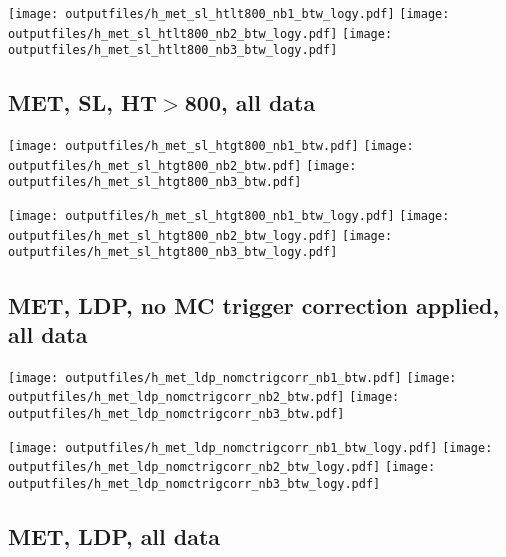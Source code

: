 \documentclass[11pt]{article}
\begin{document}
    \noindent
     \texttt{[image: outputfiles/h\_met\_sl\_htlt800\_nb1\_btw\_logy.pdf]}
     \texttt{[image: outputfiles/h\_met\_sl\_htlt800\_nb2\_btw\_logy.pdf]}
     \texttt{[image: outputfiles/h\_met\_sl\_htlt800\_nb3\_btw\_logy.pdf]}


     \subsection{ MET, SL, HT$>$800, all data}

    \noindent
     \texttt{[image: outputfiles/h\_met\_sl\_htgt800\_nb1\_btw.pdf]}
     \texttt{[image: outputfiles/h\_met\_sl\_htgt800\_nb2\_btw.pdf]}
     \texttt{[image: outputfiles/h\_met\_sl\_htgt800\_nb3\_btw.pdf]}

    \noindent
     \texttt{[image: outputfiles/h\_met\_sl\_htgt800\_nb1\_btw\_logy.pdf]}
     \texttt{[image: outputfiles/h\_met\_sl\_htgt800\_nb2\_btw\_logy.pdf]}
     \texttt{[image: outputfiles/h\_met\_sl\_htgt800\_nb3\_btw\_logy.pdf]}






     \subsection{ MET, LDP, no MC trigger correction applied, all data}

    \noindent
     \texttt{[image: outputfiles/h\_met\_ldp\_nomctrigcorr\_nb1\_btw.pdf]}
     \texttt{[image: outputfiles/h\_met\_ldp\_nomctrigcorr\_nb2\_btw.pdf]}
     \texttt{[image: outputfiles/h\_met\_ldp\_nomctrigcorr\_nb3\_btw.pdf]}

    \noindent
     \texttt{[image: outputfiles/h\_met\_ldp\_nomctrigcorr\_nb1\_btw\_logy.pdf]}
     \texttt{[image: outputfiles/h\_met\_ldp\_nomctrigcorr\_nb2\_btw\_logy.pdf]}
     \texttt{[image: outputfiles/h\_met\_ldp\_nomctrigcorr\_nb3\_btw\_logy.pdf]}


    \subsection{ MET, LDP, all data}
\end{document}
